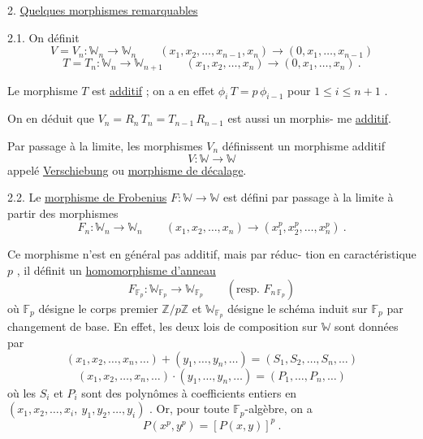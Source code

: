 \documentclass[11pt]{article}
\newcommand{\scanpage}[1]{\par\bigskip\noindent{\small\sffamily[scan #1]}\par}
\newcommand{\mspage}[1]{{\small\sffamily[p.\,#1]}}
\newcommand{\hand}[1]{\textcolor{blue}{#1}}
\newcommand{\uline}[1]{\underline{#1}}
\begin{document}
2. \uline{Quelques morphismes remarquables}

2.1. On définit
\[
V = V_n : \mathbb{W}_n \to \mathbb{W}_n \qquad (x_1,x_2,\ldots,x_{n-1},x_n) \to (0,x_1,\ldots,x_{n-1})
\]
\[
T = T_n : \mathbb{W}_n \to \mathbb{W}_{n+1} \qquad (x_1,x_2,\ldots,x_n) \to (0,x_1,\ldots,x_n) \ .
\]

Le morphisme $T$ est \uline{additif} ; on a en effet $\phi_i\, T = p\, \phi_{i-1}$
pour $1 \leq i \leq n+1$ .

On en déduit que $V_n = R_n\, T_n = T_{n-1}\, R_{n-1}$ est aussi un morphis-%
me \uline{additif}.

\mspage{\hand{17}}

\clearpage
\scanpage{129/18}
Par passage à la limite, les morphismes $V_n$ définissent un
morphisme additif
\[ V : \mathbb{W} \to \mathbb{W} \]
appelé \uline{Verschiebung} ou \uline{morphisme de décalage}.

2.2. \qquad Le \uline{morphisme de Frobenius} $F : \mathbb{W} \to \mathbb{W}$ est défini par passage
à la limite à partir des morphismes
\[ F_n : \mathbb{W}_n \to \mathbb{W}_n \qquad (x_1,x_2,\ldots,x_n) \to (x_1^p,x_2^p,\ldots,x_n^p) \ . \]

Ce morphisme n'est en général pas additif, mais par réduc-%
tion en caractéristique $p$ , il définit un \uline{homomorphisme d'anneau}
\[ F_{\mathbb{F}_p} : \mathbb{W}_{\mathbb{F}_p} \to \mathbb{W}_{\mathbb{F}_p} \qquad (\text{resp. } F_{n\,\mathbb{F}_p}) \]
où $\mathbb{F}_p$ désigne le corps premier $\mathbb{Z}/p\mathbb{Z}$ et $\mathbb{W}_{\mathbb{F}_p}$ désigne le schéma induit
sur $\mathbb{F}_p$ par changement de base. En effet, les deux lois de composition
sur $\mathbb{W}$ sont données par
\[ (x_1,x_2,\ldots,x_n,\ldots) + (y_1,\ldots,y_n,\ldots) = (S_1,S_2,\ldots,S_n,\ldots) \]
\[ (x_1,x_2,\ldots,x_n,\ldots) \cdot (y_1,\ldots,y_n,\ldots) = (P_1,\ldots,P_n,\ldots) \]
où les $S_i$ et $P_i$ sont des polynômes à coefficients entiers en
$(x_1,x_2,\ldots,x_i,\ y_1,y_2,\ldots,y_i)$ . Or, pour toute $\mathbb{F}_p$-algèbre, on a
\[ P(x^p,y^p) = [P(x,y)]^p \ . \]

\mspage{\hand{18}}
\end{document}
